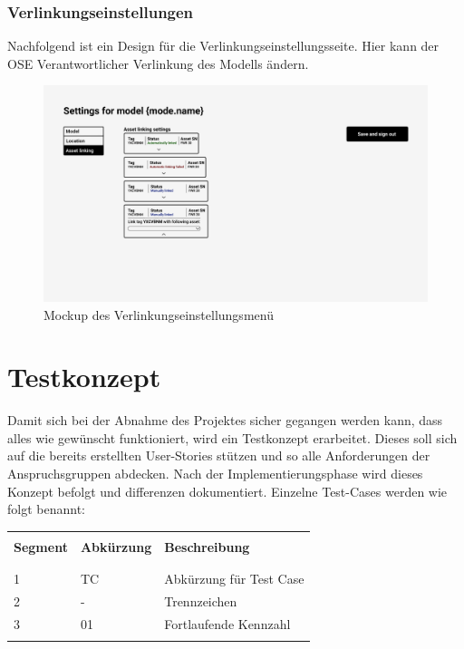 \subsubsection{Verlinkungseinstellungen}
Nachfolgend ist ein Design für die Verlinkungseinstellungsseite. Hier kann der OSE Verantwortlicher Verlinkung des Modells ändern.
\begin{figure}[H]
  \centering
  \includegraphics[width=1\textwidth]{./mockups/settings/Model-2.pdf}
  \caption[{Mockup des Verlinkungseinstellungsmenü}]{Mockup des Verlinkungseinstellungsmenü}
  \label{fig:mck-model_2}
\end{figure}
\section{Testkonzept}\label{testkonzept}
Damit sich bei der Abnahme des Projektes sicher gegangen werden kann, dass alles wie gewünscht funktioniert, wird ein Testkonzept erarbeitet. Dieses soll sich auf die bereits erstellten User-Stories stützen und so alle Anforderungen der Anspruchsgruppen abdecken. Nach der Implementierungsphase wird dieses Konzept befolgt und differenzen dokumentiert.
\newline
Einzelne Test-Cases werden wie folgt benannt:
\begin{table}[H]
  \begin{tabularx}{\textwidth}{l l X}\hline \\
  \textbf{Segment} & \textbf{Abkürzung} & \textbf{Beschreibung} \\ \\\hline \\
  1 & TC & Abkürzung für Test Case \\
  2 & - & Trennzeichen \\
  3 & 01 & Fortlaufende Kennzahl \\
  \\\hline
  \end{tabularx}
\end{table}
